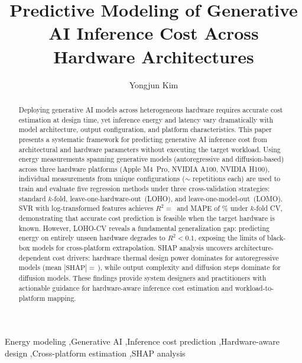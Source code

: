 \documentclass[preprint,review,12pt]{elsarticle}
\begin{document}
\begin{frontmatter}

\title{Predictive Modeling of Generative AI Inference Cost Across Hardware Architectures}

\author[ajou]{Yongjun Kim}


\begin{abstract}
Deploying generative AI models across heterogeneous hardware requires accurate cost estimation at design time, yet inference energy and latency vary dramatically with model architecture, output configuration, and platform characteristics.
This paper presents a systematic framework for predicting generative AI inference cost from architectural and hardware parameters without executing the target workload.
Using \unskip{} energy measurements spanning \unskip{} generative models (autoregressive and diffusion-based) across three hardware platforms (Apple M4~Pro, NVIDIA A100, NVIDIA H100), individual measurements from \unskip{} unique configurations (${\sim}$\unskip{} repetitions each) are used to train and evaluate five regression methods under three cross-validation strategies: standard $k$-fold, leave-one-hardware-out~(LOHO), and leave-one-model-out~(LOMO).
SVR with log-transformed features achieves $R^2 {=}$\,\unskip{} and MAPE of \unskip\% under $k$-fold CV, demonstrating that accurate cost prediction is feasible when the target hardware is known.
However, LOHO-CV reveals a fundamental generalization gap: predicting energy on entirely unseen hardware degrades to $R^2 {<} 0.1$, exposing the limits of black-box models for cross-platform extrapolation.
SHAP analysis uncovers architecture-dependent cost drivers: hardware thermal design power dominates for autoregressive models (mean $|\text{SHAP}| {=}$\,\unskip), while output complexity and diffusion steps dominate for diffusion models.
These findings provide system designers and practitioners with actionable guidance for hardware-aware inference cost estimation and workload-to-platform mapping.
\end{abstract}

\begin{keyword}
Energy modeling \sep Generative AI \sep Inference cost prediction \sep Hardware-aware design \sep Cross-platform estimation \sep SHAP analysis
\end{keyword}

\end{frontmatter}
\end{document}
